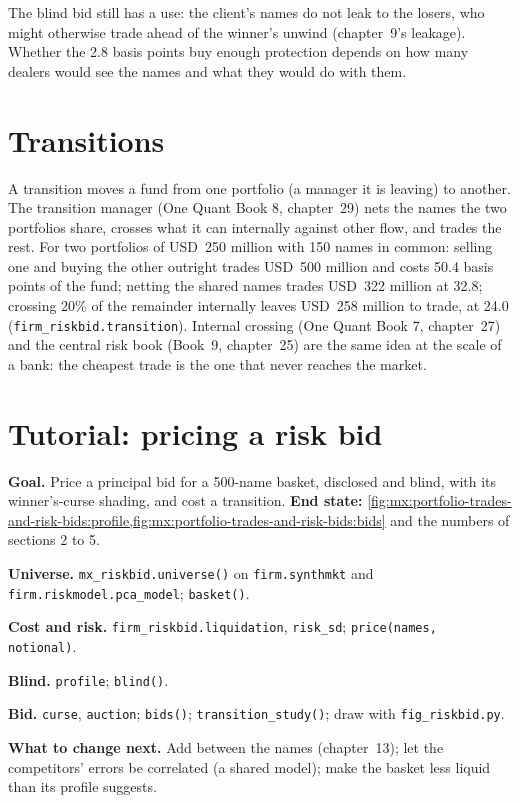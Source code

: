 The blind bid still has a use: the client's names do not leak to the losers, who might otherwise trade ahead of the winner's unwind (chapter~9's
leakage). Whether the 2.8 basis points buy enough protection depends on how many dealers would see the names and what they would do with them.

\section{Transitions}

A transition moves a fund from one portfolio (a manager it is leaving) to another. The transition manager (One Quant Book 8, chapter~29) nets the names
the two portfolios share, crosses what it can internally against other flow, and trades the rest. For two portfolios of USD~250 million with 150 names
in common: selling one and buying the other outright trades USD~500 million and costs 50.4 basis points of the fund; netting the shared names trades
USD~322 million at 32.8; crossing 20\% of the remainder internally leaves USD~258 million to trade, at 24.0 (\texttt{firm\_riskbid.transition}).
Internal crossing (One Quant Book 7, chapter~27) and the central risk book (Book~9, chapter~25) are the same idea at the scale of a bank: the cheapest
trade is the one that never reaches the market.

\section{Tutorial: pricing a risk bid}\label{tut:mx:portfolio-trades-and-risk-bids:tut}

\begin{tutorial}
\textbf{Goal.} Price a principal bid for a 500-name basket, disclosed and blind, with its winner's-curse shading, and cost a transition.
\textbf{End state:} \cref{fig:mx:portfolio-trades-and-risk-bids:profile,fig:mx:portfolio-trades-and-risk-bids:bids} and the numbers of sections 2 to 5.
\begin{tutsteps}
\item \textbf{Universe.} \texttt{mx\_riskbid.universe()} on \texttt{firm.synthmkt} and \texttt{firm.riskmodel.pca\_model}; \texttt{basket()}.
\item \textbf{Cost and risk.} \texttt{firm\_riskbid.liquidation}, \texttt{risk\_sd}; \texttt{price(names, notional)}.
\item \textbf{Blind.} \texttt{profile}; \texttt{blind()}.
\item \textbf{Bid.} \texttt{curse}, \texttt{auction}; \texttt{bids()}; \texttt{transition\_study()}; draw with \texttt{fig\_riskbid.py}.
\end{tutsteps}
\textbf{What to change next.} Add  between the names (chapter~13); let the competitors' errors be correlated (a shared model); make
the basket less liquid than its profile suggests.
\end{tutorial}

